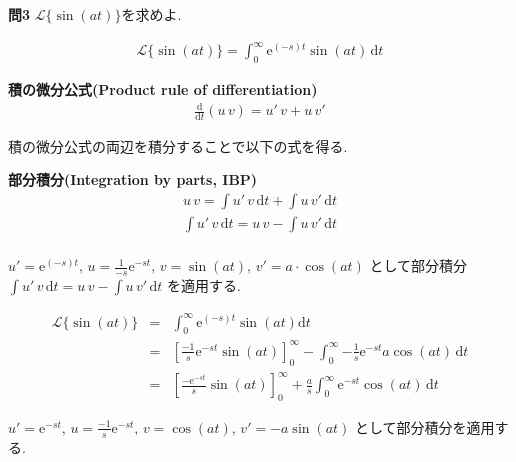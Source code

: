 ﻿\documentclass[a4j]{jarticle}
\begin{document}
\newpage

\noindent
\large{\bf{問3}} \/ \( \mathcal{L} \{ \sin(at) \} \)を求めよ.

\begin{eqnarray*}
\mathcal{L} \{ \sin(at) \} = \int_0^\infty \mathrm{e}^{(-s)t} \sin(at) \, \mathrm{d}t
\end{eqnarray*}

\begin{itembox}[l]{\large{\bf{積の微分公式(Product rule of differentiation)}}}
\begin{eqnarray*}
\frac{\mathrm{d}}{\mathrm{d}t}(u\,v) = u'\,v + u\,v'
\end{eqnarray*}
\end{itembox}

積の微分公式の両辺を積分することで以下の式を得る.

\begin{itembox}[l]{\large{\bf{部分積分(Integration by parts, IBP)}}}
\begin{eqnarray*}
u\,v = \int{ u'\,v } \, \mathrm{d}t + \int{ u\,v' }  \, \mathrm{d}t \\
\int{ u'\,v } \, \mathrm{d}t = u\,v - \int{ u\,v' } \, \mathrm{d}t \\
\end{eqnarray*}
\end{itembox}

\( u' = \mathrm{e}^{(-s)t} ,\, u = \frac{1}{-s}\mathrm{e}^{-st} ,\, v = \sin(at) ,\, v' = a \cdot \cos(at) \)
として部分積分\( \int{ u'\,v } \, \mathrm{d}t = u\,v - \int{ u\,v' } \, \mathrm{d}t \) を適用する.

\begin{eqnarray*}
\mathcal{L} \{ \sin(at) \} &=& \int_0^\infty \mathrm{e}^{(-s)t} \sin (at) \mathrm{d}t \\
                           &=& \left[ \frac{-1}{s}\mathrm{e}^{-st}\sin(at) \right]_0^\infty - \int_0^\infty{- \frac{1}{s} \mathrm{e}^{-st} a \cos(at) \, \mathrm{d}t } \\
                           &=& \left[ \frac{-\mathrm{e}^{-st}}{s}\sin(at) \right]_0^\infty + \frac{a}{s} \int_0^\infty{ \mathrm{e}^{-st} \cos(at) \, \mathrm{d}t }
\end{eqnarray*}

\( u' = \mathrm{e}^{-st} ,\, u=\frac{-1}{s}\mathrm{e}^{-st} ,\, v = \cos(at) ,\, v' = -a\sin(at) \) として部分積分を適用する.
\end{document}
